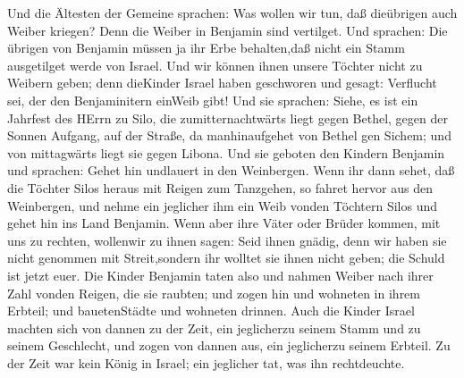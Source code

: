  Und die Ältesten der Gemeine sprachen: Was wollen wir tun,
daß dieübrigen auch Weiber kriegen? Denn die Weiber in Benjamin sind
vertilget.  Und sprachen: Die übrigen von Benjamin müssen
ja ihr Erbe behalten,daß nicht ein Stamm ausgetilget werde von Israel.
 Und wir können ihnen unsere Töchter nicht zu Weibern
geben; denn dieKinder Israel haben geschworen und gesagt: Verflucht sei,
der den Benjaminitern einWeib gibt!  Und sie sprachen:
Siehe, es ist ein Jahrfest des HErrn zu Silo, die zumitternachtwärts
liegt gegen Bethel, gegen der Sonnen Aufgang, auf der Straße, da
manhinaufgehet von Bethel gen Sichem; und von mittagwärts liegt sie
gegen Libona.  Und sie geboten den Kindern Benjamin und
sprachen: Gehet hin undlauert in den Weinbergen.  Wenn ihr
dann sehet, daß die Töchter Silos heraus mit Reigen zum Tanzgehen, so
fahret hervor aus den Weinbergen, und nehme ein jeglicher ihm ein Weib
vonden Töchtern Silos und gehet hin ins Land Benjamin. 
Wenn aber ihre Väter oder Brüder kommen, mit uns zu rechten, wollenwir
zu ihnen sagen: Seid ihnen gnädig, denn wir haben sie nicht genommen mit
Streit,sondern ihr wolltet sie ihnen nicht geben; die Schuld ist jetzt
euer.  Die Kinder Benjamin taten also und nahmen Weiber
nach ihrer Zahl vonden Reigen, die sie raubten; und zogen hin und
wohneten in ihrem Erbteil; und bauetenStädte und wohneten drinnen.
 Auch die Kinder Israel machten sich von dannen zu der
Zeit, ein jeglicherzu seinem Stamm und zu seinem Geschlecht, und zogen
von dannen aus, ein jeglicherzu seinem Erbteil.  Zu der
Zeit war kein König in Israel; ein jeglicher tat, was ihn rechtdeuchte.
